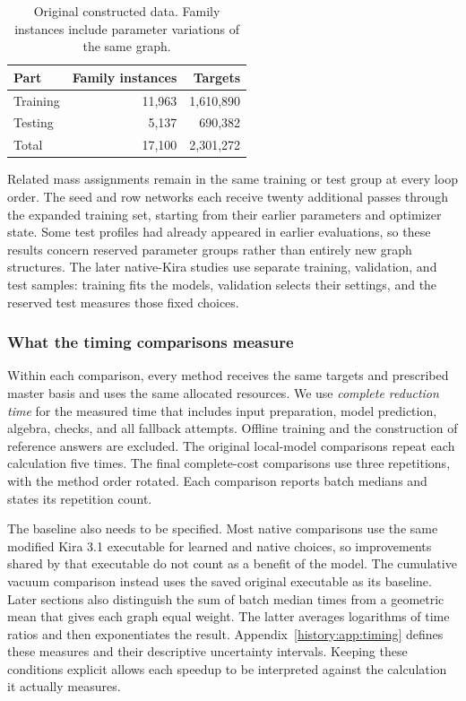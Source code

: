 \begin{table}[!htbp]
\centering\small
\caption{Original constructed data. Family instances include parameter variations of the same graph.}
\label{history:tab:data}
\begin{tabular}{@{}lrr@{}}\toprule
Part & Family instances & Targets\\\midrule
Training & 11,963 & 1,610,890\\
Testing & 5,137 & 690,382\\
Total & 17,100 & 2,301,272\\\bottomrule
\end{tabular}
\end{table}

Related mass assignments remain in the same training or test group at every loop order. The seed and row networks each receive twenty additional passes through the expanded training set, starting from their earlier parameters and optimizer state. Some test profiles had already appeared in earlier evaluations, so these results concern reserved parameter groups rather than entirely new graph structures. The later native-Kira studies use separate training, validation, and test samples: training fits the models, validation selects their settings, and the reserved test measures those fixed choices.

\subsubsection{What the timing comparisons measure}
Within each comparison, every method receives the same targets and prescribed master basis and uses the same allocated resources. We use \emph{complete reduction time} for the measured time that includes input preparation, model prediction, algebra, checks, and all fallback attempts. Offline training and the construction of reference answers are excluded. The original local-model comparisons repeat each calculation five times. The final complete-cost comparisons use three repetitions, with the method order rotated. Each comparison reports batch medians and states its repetition count.

The baseline also needs to be specified. Most native comparisons use the same modified Kira 3.1 executable for learned and native choices, so improvements shared by that executable do not count as a benefit of the model. The cumulative vacuum comparison instead uses the saved original executable as its baseline. Later sections also distinguish the sum of batch median times from a geometric mean that gives each graph equal weight. The latter averages logarithms of time ratios and then exponentiates the result. Appendix~\ref{history:app:timing} defines these measures and their descriptive uncertainty intervals. Keeping these conditions explicit allows each speedup to be interpreted against the calculation it actually measures.

